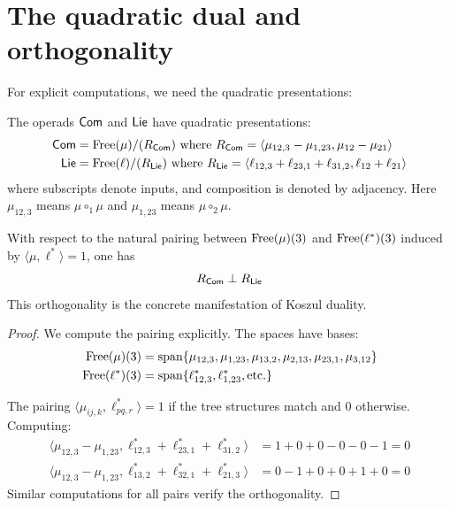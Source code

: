 \section{The quadratic dual and orthogonality}
 
For explicit computations, we need the quadratic presentations:
 
\begin{proposition}\label{prop:quadratic-presentations-com-lie}
The operads $\mathsf{Com}$ and $\mathsf{Lie}$ have quadratic presentations:
\begin{align}
\mathsf{Com} &= \operatorname{Free}(\mu)/(R_{\mathsf{Com}}) \text{ where } R_{\mathsf{Com}} = \langle \mu_{12,3} - \mu_{1,23}, \mu_{12} - \mu_{21} \rangle \\
\mathsf{Lie} &= \operatorname{Free}(\ell)/(R_{\mathsf{Lie}}) \text{ where } R_{\mathsf{Lie}} = \langle \ell_{12,3} + \ell_{23,1} + \ell_{31,2}, \ell_{12} + \ell_{21} \rangle
\end{align}
where subscripts denote inputs, and composition is denoted by adjacency. Here $\mu_{12,3}$ means $\mu \circ_1 \mu$ and $\mu_{1,23}$ means $\mu \circ_2 \mu$.
\end{proposition}
 
\begin{proposition}\label{prop:orthogonal}
With respect to the natural pairing between $\operatorname{Free}(\mu)(3)$ and
$\operatorname{Free}(\ell^*)(3)$ induced by $\langle \mu, \ell^* \rangle = 1$, one has
\[
R_{\mathsf{Com}} \perp R_{\mathsf{Lie}}
\]
This orthogonality is the concrete manifestation of Koszul duality.
\end{proposition}
 
\begin{proof}
We compute the pairing explicitly. The spaces have bases:
\begin{align}
\operatorname{Free}(\mu)(3) &= \text{span}\{\mu_{12,3}, \mu_{1,23}, \mu_{13,2}, \mu_{2,13}, \mu_{23,1}, \mu_{3,12}\} \\
\operatorname{Free}(\ell^*)(3) &= \text{span}\{\ell^*_{12,3}, \ell^*_{1,23}, \text{etc.}\}
\end{align}
 
The pairing $\langle \mu_{ij,k}, \ell^*_{pq,r} \rangle = 1$ if the tree structures match and $0$ otherwise. Computing:
\begin{align}
\langle \mu_{12,3} - \mu_{1,23}, \ell^*_{12,3} + \ell^*_{23,1} + \ell^*_{31,2} \rangle &= 1 + 0 + 0 - 0 - 0 - 1 = 0 \\
\langle \mu_{12,3} - \mu_{1,23}, \ell^*_{13,2} + \ell^*_{32,1} + \ell^*_{21,3} \rangle &= 0 - 1 + 0 + 0 + 1 + 0 = 0
\end{align}
Similar computations for all pairs verify the orthogonality.
\end{proof}


